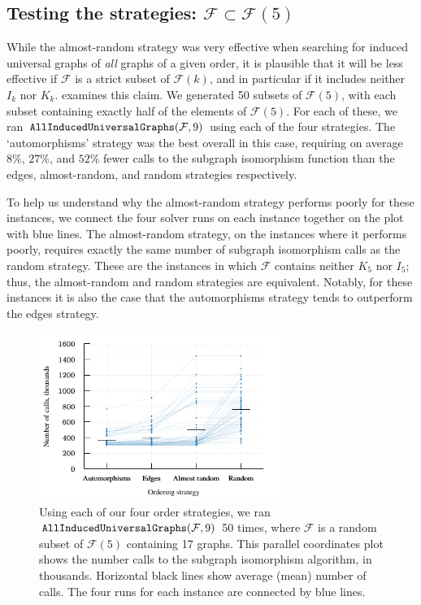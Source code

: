 \documentclass[12pt]{article}
\newcommand{\calF}{\ensuremath{\mathcal{F}}}
\begin{document}


\subsection{Testing the strategies: $\calF \subset \calF(5)$}

While the almost-random strategy was very effective when searching
for induced universal graphs of \emph{all} graphs of a given order,
it is plausible that it will be less effective if $\calF$ is a strict
subset of $\calF(k)$, and in particular if it includes
neither $I_k$ nor $K_k$.  
examines this claim.  We generated 50 subsets of $\calF(5)$,
with each subset containing exactly half of the elements of $\calF(5)$.
For each of these, we ran $\FuncSty{AllInducedUniversalGraphs}(\calF,9)$
using each of the four strategies.  The `automorphisms' strategy
was the best overall in this case, requiring on average $8\%$, $27\%$, and $52\%$
fewer calls to the subgraph isomorphism function than the edges, almost-random,
and random strategies respectively.

To help us understand why the almost-random
strategy performs poorly for these instances, we connect the four solver runs on
each instance together on the plot with blue lines.  The almost-random
strategy, on the instances where it performs poorly, requires
exactly the same number of subgraph isomorphism calls as the random strategy.
These are the instances in which $\calF$ contains neither $K_5$ nor $I_5$;
thus, the almost-random and random strategies are equivalent.  Notably,
for these instances it is also the case that the automorphisms strategy
tends to outperform the edges strategy.

\begin{figure}[htb]
    \centering

    \includegraphics*[width=0.7\textwidth]{img/second-experiment-plot-using-sample}

    \caption{Using each of our four order strategies, we ran
        $\FuncSty{AllInducedUniversalGraphs}(\calF,9)$ 50 times, where
        $\calF$ is a random subset of $\calF(5)$ containing 17 graphs. This
        parallel coordinates plot
        shows the number calls to the subgraph isomorphism algorithm, in thousands.
        Horizontal black lines show average (mean) number of calls.  The four runs for
        each instance are connected by blue lines.}
\label{fig:second-experiment-using-sample}
\end{figure}
\end{document}
